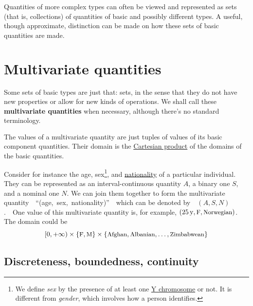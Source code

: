 \documentclass[
  a4paper,
  DIV=11,
  numbers=noendperiod,
  oneside]{scrreprt}
\begin{document}
\providecommand*{\mo}[1][=]{\mathord{\,#1\,}}
\providecommand*{\yX}{\se{X}}
\providecommand*{\yY}{\se{Y}}
\providecommand*{\yI}{\se{I}}
\providecommand*{\yi}[1][]{\se{I}_{\text{#1}}}
\providecommand{\di}{\mathrm{d}}

Quantities of more complex types can often be viewed and represented as
sets (that is, collections) of quantities of basic and possibly
different types. A useful, though approximate, distinction can be made
on how these sets of basic quantities are made.

\hypertarget{sec-data-multiv}{%
\section{Multivariate quantities}\label{sec-data-multiv}}

Some sets of basic types are just that: sets, in the sense that they do
not have new properties or allow for new kinds of operations. We shall
call these {\textbf{multivariate quantities}} when necessary, although
there's no standard terminology.

The values of a multivariate quantity are just tuples of values of its
basic component quantities. Their domain is the
\href{https://mathworld.wolfram.com/CartesianProduct.html}{Cartesian
product} of the domains of the basic quantities.

Consider for instance the age, sex\footnote{We define \emph{sex} by the
  presence of at least one
  \href{https://www.genome.gov/about-genomics/fact-sheets/Y-Chromosome-facts}{Y
  chromosome} or not. It is different from \emph{gender}, which involves
  how a person identifies.}, and
\href{https://www.gov.uk/government/publications/nationalities/list-of-nationalities}{nationality}
of a particular individual. They can be represented as an
interval-continuous quantity \(A\), a binary one \(S\), and a nominal
one \(N\). We can join them together to form the multivariate
quantity~~``(age,~sex,~nationality)''~~which can be denoted
by~~{\((A,S,N)\).}~~One value of this multivariate quantity is, for
example,
{\((25\,\mathrm{y}, \text{\small F}, \text{\small Norwegian})\).} The
domain could be \[
[0,+\infty)\times
\{\text{\small F}, \text{\small M}\} \times
\{\text{\small Afghan}, \text{\small Albanian}, \dotsc, \text{\small Zimbabwean}\}
\]

\hypertarget{discreteness-boundedness-continuity}{%
\subsection{Discreteness, boundedness,
continuity}\label{discreteness-boundedness-continuity}}
\end{document}

